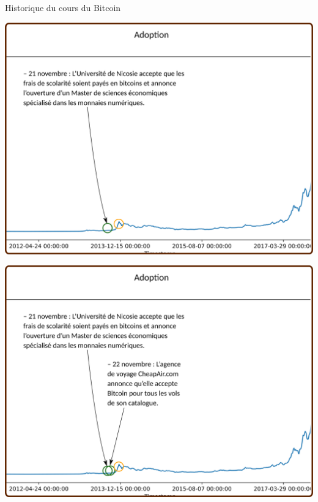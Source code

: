 \documentclass[presentation]{beamer}
\begin{document}
\begin{frame}[label={sec:org6ff9387}]{Historique du cours du Bitcoin}
\begin{block}{}
\begin{center}
\includegraphics[width=.95\textwidth]{./Pictures/Timeline/23adoption_univ.png}
\end{center}
\end{block}

\begin{block}{}
\begin{center}
\includegraphics[width=.95\textwidth]{./Pictures/Timeline/23adoption_voyage.png}
\end{center}
\end{block}


\end{frame}
\end{document}
